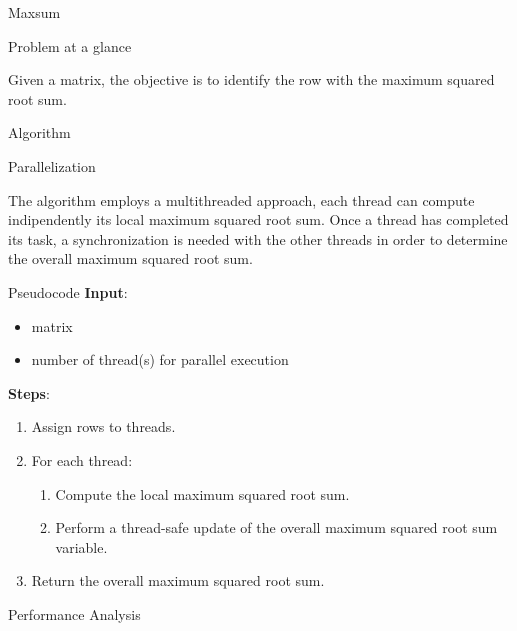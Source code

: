 \begin{chapter}{Maxsum}
    \begin{section}{Problem at a glance}
        \par Given a matrix, the objective is to identify the row with the maximum squared root sum.
    \end{section}
    \begin{section}{Algorithm}
        \begin{subsection}{Parallelization}
            \par The algorithm employs a multithreaded approach, each thread can compute indipendently its local maximum squared root sum. Once a thread has completed its task, a synchronization is needed with the other threads in order to determine the overall maximum squared root sum.
        \end{subsection}
        \begin{subsection}{Pseudocode}
            \textbf{Input}:
            \begin{itemize}
                \item matrix
                \item number of thread(s) for parallel execution
            \end{itemize}
            \textbf{Steps}:
            \begin{enumerate}
                \item Assign rows to threads.
                \item For each thread:
                \begin{enumerate}
                    \item Compute the local maximum squared root sum.
                    \item Perform a thread-safe update of the overall maximum squared root sum variable.
                \end{enumerate}
                \item Return the overall maximum squared root sum.
            \end{enumerate}
            
        \end{subsection}
        \clearpage
        \begin{subsection}{Performance Analysis}
            \begin{figure}[ht]
                \centering
                

\end{figure}
\end{subsection}
\end{section}
\end{chapter}
